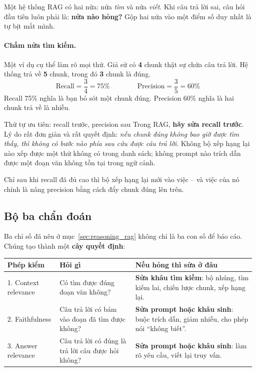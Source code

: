Một hệ thống RAG có hai nửa: nửa \emph{tìm} và nửa \emph{viết}. Khi câu trả lời sai, câu hỏi đầu tiên luôn phải là: \textbf{nửa nào hỏng?} Gộp hai nửa vào một điểm số duy nhất là tự bịt mắt mình.

\paragraph{Chấm nửa tìm kiếm.} Một ví dụ cụ thể làm rõ mọi thứ. Giả sử có \textbf{4} chunk thật sự chứa câu trả lời. Hệ thống trả về \textbf{5} chunk, trong đó \textbf{3} chunk là đúng.
\[
\text{Recall} = \frac{3}{4} = 75\% \qquad\qquad \text{Precision} = \frac{3}{5} = 60\%
\]
Recall 75\% nghĩa là bạn bỏ sót một chunk đúng. Precision 60\% nghĩa là hai chunk trả về là nhiễu.

\begin{keyidea}{Thứ tự ưu tiên: recall trước, precision sau}
Trong RAG, \textbf{hãy sửa recall trước}. Lý do rất đơn giản và rất quyết định: \emph{nếu chunk đúng không bao giờ được tìm thấy, thì không có bước nào phía sau cứu được câu trả lời}. Không bộ xếp hạng lại nào xếp được một thứ không có trong danh sách; không prompt nào trích dẫn được một đoạn văn không tồn tại trong ngữ cảnh.

Chỉ sau khi recall đã đủ cao thì bộ xếp hạng lại mới vào việc -- và việc của nó chính là nâng precision bằng cách đẩy chunk đúng lên trên.
\end{keyidea}

\subsection{Bộ ba chẩn đoán}
\label{ssec:rag_triad}

Ba chỉ số đã nêu ở mục~\ref{sec:reasoning_rag} không chỉ là ba con số để báo cáo. Chúng tạo thành một \textbf{cây quyết định}:

\begin{center}
\small
\begin{tabularx}{\linewidth}{@{}llX@{}}
\toprule
\textbf{Phép kiểm} & \textbf{Hỏi gì} & \textbf{Nếu hỏng thì sửa ở đâu} \\
\midrule
1. Context relevance & Có tìm được đúng đoạn văn không? & \textbf{Sửa khâu tìm kiếm}: bộ nhúng, tìm kiếm lai, chiến lược chunk, xếp hạng lại. \\
2. Faithfulness & Câu trả lời có bám vào đoạn đã tìm được không? & \textbf{Sửa prompt hoặc khâu sinh}: buộc trích dẫn, giảm nhiễu, cho phép nói “không biết”. \\
3. Answer relevance & Câu trả lời có đúng là trả lời câu được hỏi không? & \textbf{Sửa prompt hoặc khâu sinh}: làm rõ yêu cầu, viết lại truy vấn. \\
\bottomrule
\end{tabularx}
\end{center}

